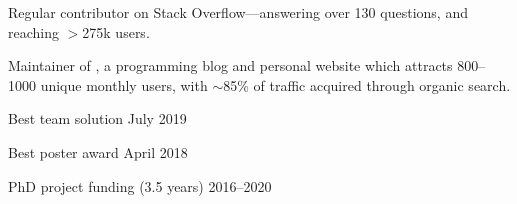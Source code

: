 \documentclass[12pt, a4paper]{article}
\begin{document}
\clearpage
{}

       {Regular contributor on Stack Overflow---answering over 130 questions,
       and reaching $>$275k users.}%

       {Maintainer of \href{https://\website}{\website}, a programming blog and
       personal website which attracts 800--1000 unique monthly users, with
       $\sim$85\% of traffic acquired through organic search.}





%
          {Best team solution}%
          {July 2019}

%
          {Best poster award}%
          {April 2018}

%
          {PhD project funding (3.5 years)}%
          {2016--2020}
\end{document}
